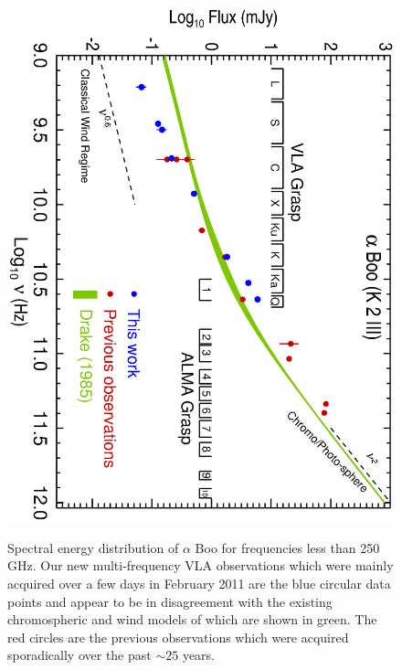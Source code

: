 \documentclass[iop]{emulateapj}
\begin{document}
\begin{figure}
\centering
\includegraphics[trim = 0mm 0mm 0mm 20mm, clip,scale=0.65, angle=90]{fig1.ps}
\\
\caption{Spectral energy distribution of $\alpha$ Boo for frequencies less than 250 GHz. Our new multi-frequency VLA observations which were mainly acquired over a few days in February 2011 are the blue circular data points and appear to be in disagreement with the existing chromospheric and wind models of \cite{1985pssl.proc..351D} which are shown in green. The red circles are the previous observations which were acquired sporadically over the past $\sim 25$ years.}
\label{fig:fig1}
\centering

\end{figure}
\end{document}
